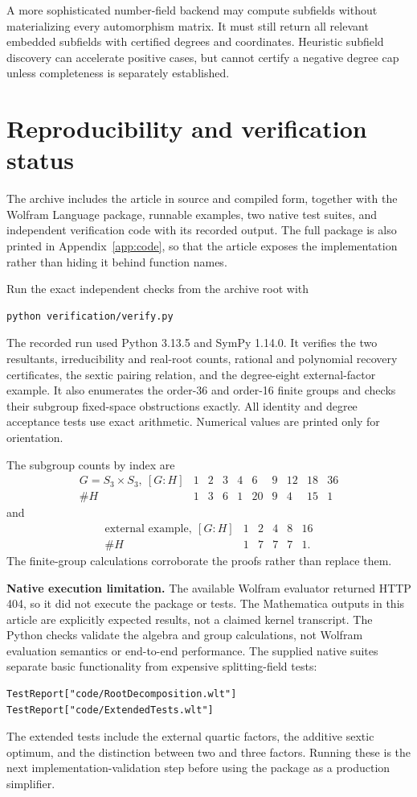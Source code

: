 \documentclass[11pt,a4paper]{article}
\theoremstyle{definition}\newtheorem{definition}[theorem]{Definition}
\theoremstyle{remark}\newtheorem{remark}[theorem]{Remark}
\begin{document}
A more sophisticated number-field backend may compute subfields without
materializing every automorphism matrix. It must still return all relevant
embedded subfields with certified degrees and coordinates. Heuristic
subfield discovery can accelerate positive cases, but cannot certify a
negative degree cap unless completeness is separately established.

\section{Reproducibility and verification status}
\label{sec:verification}

The archive includes the article in source and compiled form, together with
the Wolfram Language package, runnable examples, two native test suites, and
independent verification code with its recorded output. The full package is
also printed in Appendix~\ref{app:code}, so that the article exposes the
implementation rather than hiding it behind function names.

Run the exact independent checks from the archive root with
\begin{lstlisting}[language={}]
python verification/verify.py
\end{lstlisting}
The recorded run used Python 3.13.5 and SymPy 1.14.0. It verifies the two
resultants, irreducibility and real-root counts, rational and polynomial
recovery certificates, the sextic pairing relation, and the degree-eight
external-factor example. It also enumerates the order-36 and order-16
finite groups and checks their subgroup fixed-space obstructions exactly.
All identity and degree acceptance tests use exact arithmetic. Numerical
values are printed only for orientation.

The subgroup counts by index are
\[
\begin{array}{c|rrrrrrrrr}
G=S_3\times S_3,\ [G:H]&1&2&3&4&6&9&12&18&36\\\hline
\#H&1&3&6&1&20&9&4&15&1
\end{array}
\]
and
\[
\begin{array}{c|rrrrr}
\text{external example},\ [G:H]&1&2&4&8&16\\\hline
\#H&1&7&7&7&1.
\end{array}
\]
The finite-group calculations corroborate the proofs rather than replace
them.

\textbf{Native execution limitation.} The available Wolfram evaluator
returned HTTP 404, so it did not execute the package or tests. The
Mathematica outputs in this article are explicitly expected results, not a
claimed kernel transcript. The Python checks validate the algebra and group
calculations, not Wolfram evaluation semantics or end-to-end performance.
The supplied native suites separate basic functionality from expensive
splitting-field tests:
\begin{lstlisting}
TestReport["code/RootDecomposition.wlt"]
TestReport["code/ExtendedTests.wlt"]
\end{lstlisting}
The extended tests include the external quartic factors, the additive
sextic optimum, and the distinction between two and three factors. Running
these is the next implementation-validation step before using the package
as a production simplifier.
\end{document}
